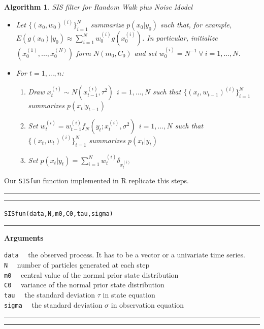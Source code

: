 \documentclass[
]{book}
\theoremstyle{break}
\theoremstyle{nonumberplain}
\newtheorem{algorithm}{Algorithm}[section]
\begin{document}
\begin{algorithm} SIS filter for Random Walk plus Noise Model
\begin{itemize}
\item Let $\{(x_{0},w_{0})^{(i)}\}_{i=1}^{N}$ summarize $p(x_{0}|y_{0})$ such that, for example, $E(g(x_{0})|y_{0}) \approx \sum_{i=1}^{N}w_{0}^{(i)}g(x_{0}^{(i)})$. In particular, initialize $(x_{0}^{(1)},...,x_{0}^{(N)})$ form $N(m_{0},C_{0})$ and set $w_{0}^{(i)}=N^{-1} \ \forall \ i=1,...,N$.
\item For $t=1,...,n$:
\begin{enumerate}
\item Draw $x_{t}^{(i)} \sim N(x_{t-1}^{(i)},\tau^2) \ \ i=1,...,N$ such that $\{(x_{t},w_{t-1})^{(i)}\}_{i=1}^{N}$ summarizes $p(x_{t}|y_{t-1})$
\item Set $w_{t}^{(i)} = w_{t-1}^{(i)}f_{N}(y_{t};x_{t}^{(i)},\sigma^2) \ \ i=1,...,N$ such that $\{(x_{t},w_{t})^{(i)}\}_{i=1}^{N}$ summarizes $p(x_{t}|y_{t})$
\item Set $p(x_{t}|y_{t})=\sum_{i=1}^{N}w_{t}^{(i)}\delta_{x_{t}^{(i)}}$
\end{enumerate}
\end{itemize}
\end{algorithm}

Our \texttt{SISfun} function implemented in R replicate this steps.\\

\hrule
\hrule

\texttt{SISfun(data,N,m0,C0,tau,sigma)}\\

\hrule

\textbf{Arguments}

\texttt{data} ~~the observed process. It has to be a vector or a
univariate time series.\\
\texttt{N} ~~number of particles generated at each step\\
\texttt{m0} ~~central value of the normal prior state distribution\\
\texttt{C0} ~~variance of the normal prior state distribution\\
\texttt{tau} ~~the standard deviation \(\tau\) in state equation\\
\texttt{sigma} ~~the standard deviation \(\sigma\) in observation
equation

\hrule
\hrule
\end{document}
